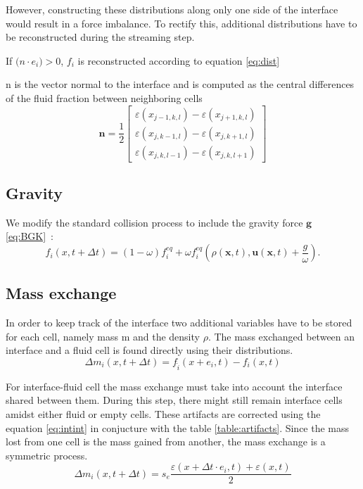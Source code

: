 \documentclass[10pt,a4paper,notitlepage]{article}
\begin{document}
However, constructing these distributions along only one side of the interface would result in a force imbalance. To rectify this, additional distributions have to be reconstructed during the streaming step.

If $\mathbf(n \cdot e_{i})>0$, $f_{i}$ is reconstructed according to equation \eqref{eq:dist}

n is the vector normal to the interface and is computed as the central differences of the fluid fraction between neighboring cells
\begin{equation} \label{eq:normal}
  \mathbf{n}=\frac{1}{2}\begin{bmatrix} \varepsilon(x_{j-1,k,l})-\varepsilon(x_{j+1,k,l})\\\varepsilon(x_{j,k-1,l})-\varepsilon(x_{j,k+1,l})
    \\
    \varepsilon(x_{j,k,l-1})-\varepsilon(x_{j,k,l+1} ) \end{bmatrix}
\end{equation}

\subsection{Gravity }
We modify the standard collision process to include the gravity force $\bm{g}$ \eqref{eq:BGK}~\cite{thurey2006optimization}:
\begin{equation} \label{eq:BGK}
f_{i}(x,t+\Delta t)=(1-\omega)f_{i}^{eq}+\omega f_{i}^{eq}(\rho(\mathbf{x},t),\mathbf{u}(\mathbf{x},t)+\frac{g}{\omega}).
\end{equation}
\subsection{Mass exchange}
In order to keep track of the interface two additional variables have to be stored for each cell, namely mass m and the density $\rho$. The mass exchanged between an interface and a fluid cell  is found directly using their distributions. 
\begin{equation} \label{eq:fluid-interface}
\Delta m_{i}(x,t+\Delta t)=f_{\hat{i}}(x+e_{i},t)-f_{i}(x,t)
\end{equation}

For interface-fluid cell the mass exchange must take into account the interface shared between them. During this step, there might still remain interface cells amidst either fluid or empty cells. These artifacts are corrected using the equation \eqref{eq:intint} in conjucture with the table \ref{table:artifacts}. Since the mass lost from one cell is the mass gained from another, the mass exchange is a symmetric process.
\begin{equation} \label{eq:intint}
\Delta m_{i}(x,t+\Delta t)=s_{e} \frac{\varepsilon(x+\Delta t \cdot e_{i},t)+\varepsilon(x,t)}{2}
\end{equation}
\end{document}
